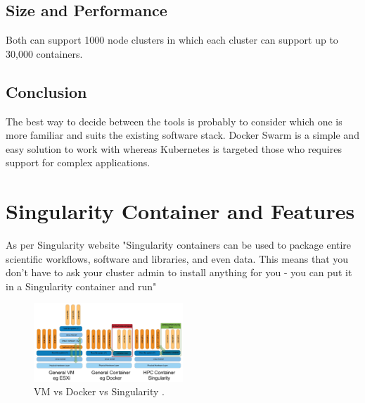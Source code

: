 \documentclass[sigconf]{acmart}
\begin{document}
	\subsection{Size and Performance}
	Both can support 1000 node clusters in which each cluster can support up to 30,000 containers.
	\subsection{Conclusion}
	The best way to decide between the tools is probably to consider which one is more familiar and suits the existing software stack. 
	Docker Swarm is a simple and easy solution to work with whereas Kubernetes is targeted those who requires support for complex applications.
	\section {Singularity Container and Features}
	As per Singularity website "Singularity containers can be used to package entire scientific workflows, software and libraries, and even data. This means that you don't have to ask your cluster admin to install anything for you - you can put it in a Singularity container and run"
	
	\begin{figure}[h]
		\includegraphics[width=0.5\textwidth]{images/vm_docker_singularity}
		\caption{VM vs Docker vs Singularity \cite{vmDockerSingularity}.} \label{fig:figure3} 
	\end{figure}
	
\end{document}
